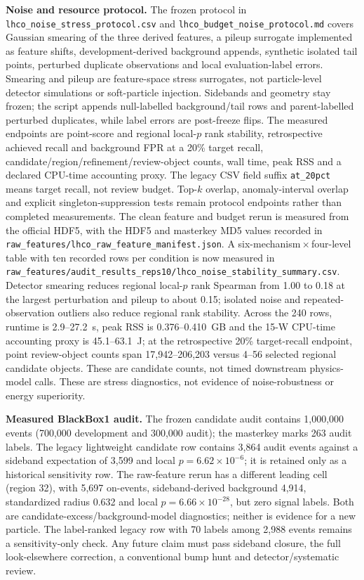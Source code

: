 \documentclass[11pt,a4paper]{article}
\numberwithin{equation}{section}
\theoremstyle{definition}\newtheorem{definition}[theorem]{Definition}
\theoremstyle{remark}\newtheorem{remark}[theorem]{Remark}
\begin{document}
\textbf{Noise and resource protocol.} The frozen protocol in \texttt{lhco\_noise\_stress\_protocol.csv} and \texttt{lhco\_budget\_noise\_protocol.md} covers Gaussian smearing of the three derived features, a pileup surrogate implemented as feature shifts, development-derived background appends, synthetic isolated tail points, perturbed duplicate observations and local evaluation-label errors. Smearing and pileup are feature-space stress surrogates, not particle-level detector simulations or soft-particle injection. Sidebands and geometry stay frozen; the script appends null-labelled background/tail rows and parent-labelled perturbed duplicates, while label errors are post-freeze flips. The measured endpoints are point-score and regional local-$p$ rank stability, retrospective achieved recall and background FPR at a 20\% target recall, candidate/region/refinement/review-object counts, wall time, peak RSS and a declared CPU-time accounting proxy. The legacy CSV field suffix \texttt{at\_20pct} means target recall, not review budget. Top-$k$ overlap, anomaly-interval overlap and explicit singleton-suppression tests remain protocol endpoints rather than completed measurements. The clean feature and budget rerun is measured from the official HDF5, with the HDF5 and masterkey MD5 values recorded in \texttt{raw\_features/lhco\_raw\_feature\_manifest.json}. A six-mechanism\,$\times$\,four-level table with ten recorded rows per condition is now measured in \texttt{raw\_features/audit\_results\_reps10/lhco\_noise\_stability\_summary.csv}. Detector smearing reduces regional local-$p$ rank Spearman from 1.00 to 0.18 at the largest perturbation and pileup to about 0.15; isolated noise and repeated-observation outliers also reduce regional rank stability. Across the 240 rows, runtime is 2.9--27.2~s, peak RSS is 0.376--0.410~GB and the 15-W CPU-time accounting proxy is 45.1--63.1~J; at the retrospective 20\% target-recall endpoint, point review-object counts span 17,942--206,203 versus 4--56 selected regional candidate objects. These are candidate counts, not timed downstream physics-model calls. These are stress diagnostics, not evidence of noise-robustness or energy superiority.

\textbf{Measured BlackBox1 audit.} The frozen candidate audit contains 1,000,000 events (700,000 development and 300,000 audit); the masterkey marks 263 audit labels. The legacy lightweight candidate row contains 3,864 audit events against a sideband expectation of 3,599 and local $p=6.62\times10^{-6}$; it is retained only as a historical sensitivity row. The raw-feature rerun has a different leading cell (region 32), with 5,697 on-events, sideband-derived background 4,914, standardized radius 0.632 and local $p=6.66\times10^{-28}$, but zero signal labels. Both are candidate-excess/background-model diagnostics; neither is evidence for a new particle. The label-ranked legacy row with 70 labels among 2,988 events remains a sensitivity-only check. Any future claim must pass sideband closure, the full look-elsewhere correction, a conventional bump hunt and detector/systematic review.
\end{document}
